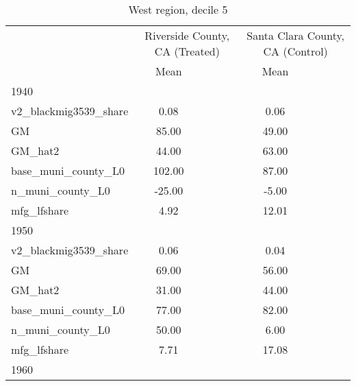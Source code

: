 \begin{table}[htbp]\centering
\def\sym#1{\ifmmode^{#1}\else\(^{#1}\)\fi}
\caption{West region, decile 5 \label{tab1}}
\begin{tabular}{l*{2}{ccc}}
\toprule
                    &\multicolumn{3}{c}{Riverside County, CA (Treated)}&\multicolumn{3}{c}{Santa Clara County, CA (Control)}\\
                    &        Mean&            &            &        Mean&            &            \\
\midrule
1940                &            &            &            &            &            &            \\
v2\_blackmig3539\_share&        0.08&            &            &        0.06&            &            \\
GM                  &       85.00&            &            &       49.00&            &            \\
GM\_hat2             &       44.00&            &            &       63.00&            &            \\
base\_muni\_county\_L0 &      102.00&            &            &       87.00&            &            \\
n\_muni\_county\_L0    &      -25.00&            &            &       -5.00&            &            \\
mfg\_lfshare         &        4.92&            &            &       12.01&            &            \\
\midrule
1950                &            &            &            &            &            &            \\
v2\_blackmig3539\_share&        0.06&            &            &        0.04&            &            \\
GM                  &       69.00&            &            &       56.00&            &            \\
GM\_hat2             &       31.00&            &            &       44.00&            &            \\
base\_muni\_county\_L0 &       77.00&            &            &       82.00&            &            \\
n\_muni\_county\_L0    &       50.00&            &            &        6.00&            &            \\
mfg\_lfshare         &        7.71&            &            &       17.08&            &            \\
\midrule
1960                &            &            &            &            &            &            \\

\end{tabular}
\end{table}

